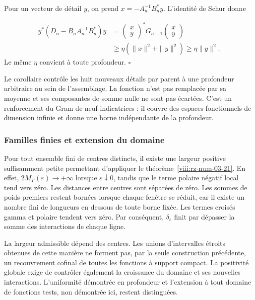 Pour un vecteur de détail \(y\), on prend \(x=-A_n^{-1}B_n^*y\). L'identité de Schur donne

\[
\begin{aligned}
y^*(D_n-B_nA_n^{-1}B_n^*)y
&=\begin{pmatrix}x\\y\end{pmatrix}^*G_{n+1}
\begin{pmatrix}x\\y\end{pmatrix}\\
&\geq\eta(\|x\|^2+\|y\|^2)\geq\eta\|y\|^2.
\end{aligned}
\]
Le même \(\eta\) convient à toute profondeur. \hfill\(\square\)

Le corollaire contrôle les huit nouveaux détails par parent à une profondeur arbitraire au sein de l’assemblage. La fonction n’est pas remplacée par sa moyenne et ses composantes de somme nulle ne sont pas écartées. C’est un renforcement du Gram de neuf indicatrices : il couvre des espaces fonctionnels de dimension infinie et donne une borne indépendante de la profondeur.

\subsubsection*{Familles finies et extension du domaine}
Pour tout ensemble fini de centres distincts, il existe une largeur positive suffisamment petite permettant d'appliquer le théorème~\ref{viii:rz-num-03-21}. En effet, \(2M_\Gamma(\varepsilon)\to+\infty\) lorsque \(\varepsilon\downarrow0\), tandis que le terme polaire négatif local tend vers zéro. Les distances entre centres sont séparées de zéro. Les sommes de poids premiers restent bornées lorsque chaque fenêtre se réduit, car il existe un nombre fini de longueurs en dessous de toute borne fixée. Les termes croisés gamma et polaire tendent vers zéro. Par conséquent, \(\delta_\varepsilon\) finit par dépasser la somme des interactions de chaque ligne.

La largeur admissible dépend des centres. Les unions d’intervalles étroits obtenues de cette manière ne forment pas, par la seule construction précédente, un recouvrement cofinal de toutes les fonctions à support compact. La positivité globale exige de contrôler également la croissance du domaine et ses nouvelles interactions. L’uniformité démontrée en profondeur et l’extension à tout domaine de fonctions tests, non démontrée ici, restent distinguées.

